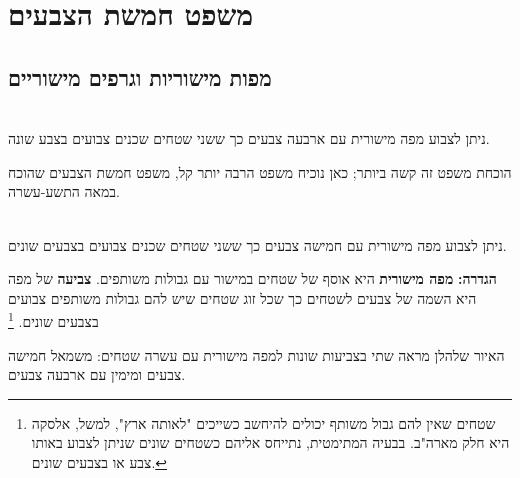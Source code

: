 


\chapter{משפט חמשת הצבעים}
\label{c.five}


\section{מפות מישוריות וגרפים מישוריים}\label{s.planar}

\begin{theorem}\mbox{}\\
ניתן לצבוע מפה מישורית עם ארבעה צבעים כך ששני שטחים שכנים צבועים בצבע שונה.
\end{theorem}

הוכחת משפט זה קשה ביותר; כאן נוכיח משפט הרבה יותר קל, משפט חמשת הצבעים שהוכח במאה התשע-עשרה.

\begin{theorem}\mbox{}\\
ניתן לצבוע מפה מישורית עם חמישה צבעים כך ששני שטחים שכנים צבועים בצבעים שונים.
\end{theorem}

\textbf{הגדרה:}
\textbf{מפה מישורית}
היא אוסף של שטחים במישור עם גבולות משותפים.
\textbf{צביעה}
של מפה היא השמה של צבעים לשטחים כך שכל זוג שטחים שיש להם גבולות  משותפים צבועים בצבעים שונים.%
\footnote{%
שטחים שאין להם גבול משותף יכולים להיחשב כשייכים "לאותה ארץ", למשל, אלסקה היא חלק מארה"ב. בבעיה המתימטית, נתייחס אליהם  כשטחים שונים שניתן לצבוע באותו צבע או בצבעים שונים.%
}

האיור שלהלן
מראה שתי בצביעות שונות למפה מישורית עם עשרה שטחים: משמאל חמישה צבעים ומימין עם ארבעה צבעים.

